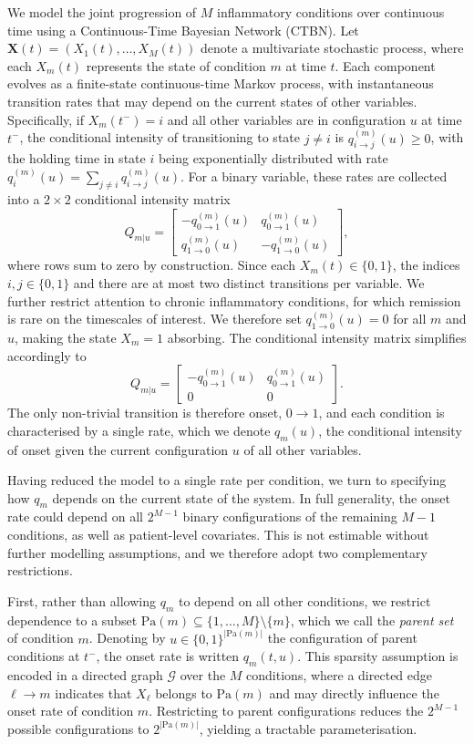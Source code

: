 \documentclass[12pt]{article}
\begin{document}
We model the joint progression of $M$ inflammatory conditions over continuous time using a Continuous-Time Bayesian Network (CTBN). Let $\mathbf{X}(t) = (X_1(t), \dots, X_M(t))$ denote a multivariate stochastic process, where each $X_m(t)$ represents the state of condition $m$ at time $t$. Each component evolves as a finite-state continuous-time Markov process, with instantaneous transition rates that may depend on the current states of other variables. Specifically, if $X_m(t^-) = i$ and all other variables are in configuration $u$ at time $t^-$, the conditional intensity of transitioning to state $j \neq i$ is $q_{i \to j}^{(m)}(u) \geq 0$, with the holding time in state $i$ being exponentially distributed with rate $q_i^{(m)}(u) = \sum_{j \neq i} q_{i \to j}^{(m)}(u)$. For a binary variable, these rates are collected into a $2 \times 2$ conditional intensity matrix
\[
Q_{m|u} =
\begin{bmatrix}
-q_{0\to1}^{(m)}(u) & q_{0\to1}^{(m)}(u) \\
q_{1\to0}^{(m)}(u) & -q_{1\to0}^{(m)}(u)
\end{bmatrix},
\]
where rows sum to zero by construction. Since each $X_m(t) \in \{0,1\}$, the indices $i, j \in \{0,1\}$ and there are at most two distinct transitions per variable. We further restrict attention to chronic inflammatory conditions, for which remission is rare on the timescales of interest. We therefore set $q_{1 \to 0}^{(m)}(u) = 0$ for all $m$ and $u$, making the state $X_m = 1$ absorbing. The conditional intensity matrix simplifies accordingly to
\[
Q_{m|u} =
\begin{bmatrix}
-q_{0\to1}^{(m)}(u) & q_{0\to1}^{(m)}(u) \\
0 & 0
\end{bmatrix}.
\]
The only non-trivial transition is therefore onset, $0 \to 1$, and each condition is characterised by a single rate, which we denote $q_m(u)$, the conditional intensity of onset given the current configuration $u$ of all other variables. 

Having reduced the model to a single rate per condition, we turn to specifying how $q_m$ depends on the current state of the system. In full generality, the onset rate could depend on all $2^{M-1}$ binary configurations of the remaining $M-1$ conditions, as well as patient-level covariates. This is not estimable without further modelling assumptions, and we therefore adopt two complementary restrictions.

First, rather than allowing $q_m$ to depend on all other conditions, we restrict dependence to a subset $\mathrm{Pa}(m) \subseteq \{1, \dots, M\} \setminus \{m\}$, which we call the \emph{parent set} of condition $m$. Denoting by $u \in \{0,1\}^{|\mathrm{Pa}(m)|}$ the configuration of parent conditions at $t^-$, the onset rate is written $q_m(t, u)$. This sparsity assumption is encoded in a directed graph $\mathcal{G}$ over the $M$ conditions, where a directed edge $\ell \to m$ indicates that $X_\ell$ belongs to $\mathrm{Pa}(m)$ and may directly influence the onset rate of condition $m$. Restricting to parent configurations reduces the $2^{M-1}$ possible configurations to $2^{|\mathrm{Pa}(m)|}$, yielding a tractable parameterisation.
\end{document}
